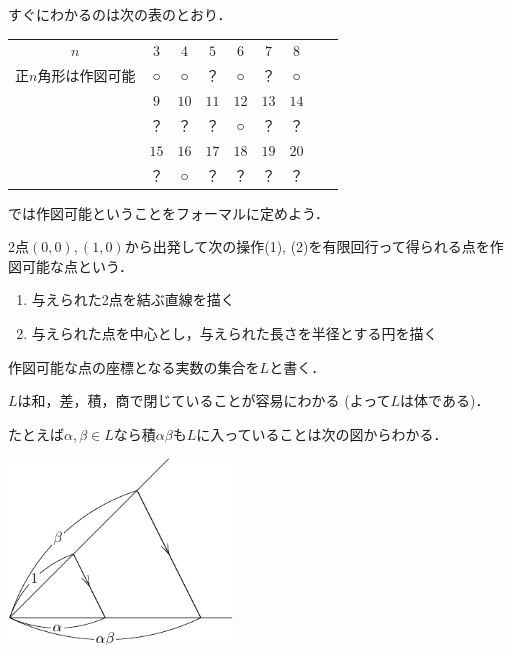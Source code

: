 \documentclass[dvipdfmx,17pt]{beamer}
\theoremstyle{plain}
\begin{document}
\begin{frame}
すぐにわかるのは次の表のとおり．
\small
\begin{table}[h]
  \begin{tabular}{ccccccccc}
    $n$ & $3$ & $4$ & $5$ & $6$ & $7$ & $8$ \\
    正$n$角形は作図可能 & ○ & ○ & ？ & ○ & ？ & ○ \\
     & $9$ & $10$ & $11$ & $12$ & $13$ & $14$ \\
     & ？ & ？ & ？ & ○ & ？ & ？ \\
     & $15$ & $16$ & $17$ & $18$ & $19$ & $20$ \\
     & ？ & ○ & ？ & ？ & ？ & ？
  \end{tabular}
\end{table}
\end{frame}

\begin{frame}
では作図可能ということをフォーマルに定めよう．

2点$(0,0), (1,0)$から出発して次の操作(1), (2)を有限回行って得られる点を作図可能な点という．
\begin{enumerate}
\item 与えられた2点を結ぶ直線を描く
\item 与えられた点を中心とし，与えられた長さを半径とする円を描く
\end{enumerate}
作図可能な点の座標となる実数の集合を$L$と書く．
\end{frame}

\begin{frame}
$L$は和，差，積，商で閉じていることが容易にわかる (よって$L$は体である)．

たとえば$\alpha, \beta \in L$なら積$\alpha \beta$も$L$に入っていることは次の図からわかる．

\begin{center}\includegraphics[height=5cm]{mult-crop.pdf}\end{center}
\end{frame}
\end{document}
